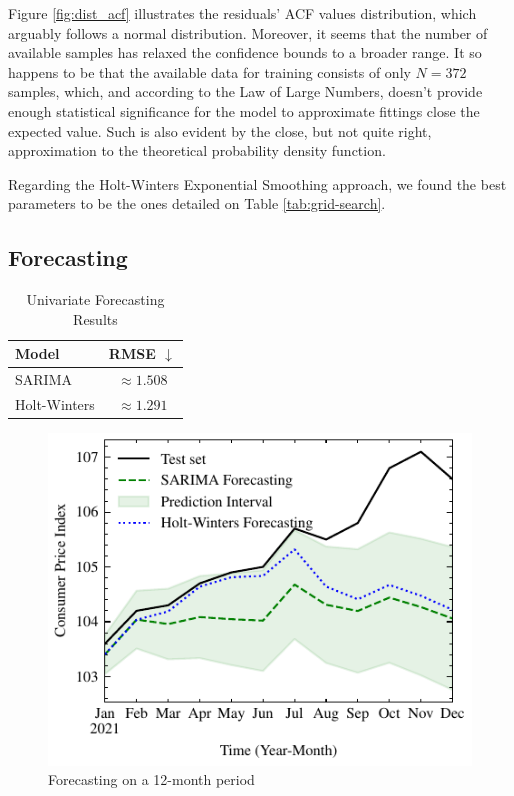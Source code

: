 \documentclass[conference]{IEEEtran}
\begin{document}
Figure \ref{fig:dist_acf} illustrates the residuals' ACF values distribution, which arguably follows a normal distribution. Moreover, it seems that the number of available samples has relaxed the confidence bounds to a broader range. It so happens to be that the available data for training consists of only $N=372$ samples, which, and according to the Law of Large Numbers, doesn't provide enough statistical significance for the model to approximate fittings close the expected value. Such is also evident by the close, but not quite right, approximation to the theoretical probability density function.

Regarding the Holt-Winters Exponential Smoothing approach, we found the best parameters to be the ones detailed on Table \ref{tab:grid-search}.
\subsection{Forecasting}

\begin{table}[btp]
    \caption{Univariate Forecasting Results}
    \centering
    \begin{tabular}{l|c}
        Model & RMSE $\downarrow$ \\
        \hline
        SARIMA & $\approx 1.508$ \\
        Holt-Winters & \cellcolor{green!25} $\approx 1.291$ \\
    \end{tabular}
    \label{tab:forecasting}
\end{table}

\begin{figure}[H]
    \centering
    \includegraphics{../figs/forecast.pdf}
    \caption{Forecasting on a 12-month period}
    \label{fig:forecasting}
\end{figure}
\end{document}
